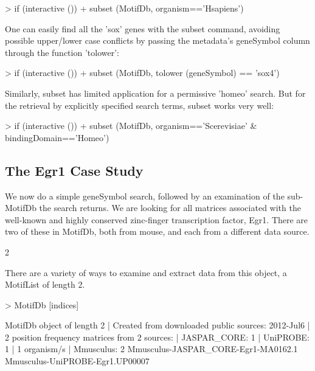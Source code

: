 \documentclass{article}
\renewenvironment{Schunk}{\vspace{\topsep}}{\vspace{\topsep}}
\begin{document}
\begin{Schunk}
\begin{Sinput}
> if (interactive ())
+   subset (MotifDb, organism=='Hsapiens')
\end{Sinput}
\end{Schunk}
One can easily find all the 'sox' genes with the subset command, avoiding possible upper/lower case conflicts by passing
the metadata's geneSymbol column through the function 'tolower':
\begin{Schunk}
\begin{Sinput}
> if (interactive ())
+   subset (MotifDb, tolower (geneSymbol) == 'sox4')
\end{Sinput}
\end{Schunk}
Similarly, subset has limited application for a permissive 'homeo' search.
But for the retrieval by explicitly specified search terms, subset works very well:
\begin{Schunk}
\begin{Sinput}
> if (interactive ())
+   subset (MotifDb, organism=='Scerevisiae' & bindingDomain=='Homeo')
\end{Sinput}
\end{Schunk}

\subsection{The Egr1 Case Study}

We now do a simple geneSymbol search, followed by an examination of the sub-MotifDb the search returns.  We are looking for all matrices
associated with the well-known and highly conserved zinc-finger transcription factor, Egr1.
There are two of these in MotifDb, both from mouse, and each from a different data source.

\begin{Schunk}
\begin{Soutput}
[1] 2
\end{Soutput}
\end{Schunk}
There are a variety of ways to examine and extract data from this object, a MotifList of length 2.  
\begin{Schunk}
\begin{Sinput}
> MotifDb [indices]
\end{Sinput}
\begin{Soutput}
MotifDb object of length 2
| Created from downloaded public sources: 2012-Jul6
| 2 position frequency matrices from 2 sources:
|        JASPAR_CORE:    1
|           UniPROBE:    1
| 1 organism/s
|          Mmusculus:    2
Mmusculus-JASPAR_CORE-Egr1-MA0162.1 
Mmusculus-UniPROBE-Egr1.UP00007 
\end{Soutput}
\end{Schunk}
\end{document}
